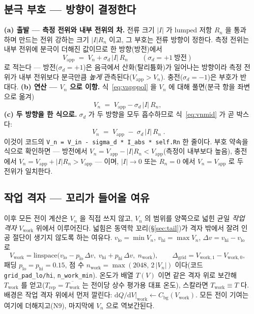 \documentclass[11pt,a4paper]{article}
\newcommand{\dd}{\mathrm{d}}
\newcommand{\app}{\mathrm{app}}
\newcommand{\bg}{\mathrm{bg}}
\newcommand{\work}{\mathrm{work}}
\newcommand{\code}[1]{\texttt{#1}}
\begin{document}
\subsection{분극 부호 — 방향이 결정한다}
\textbf{(a) 출발 — 측정 전위와 내부 전위의 차.} 전류 크기 $|I|$ 가 lumped 저항 $R_n$ 을 통과하며 만드는 전위 강하는
크기 $|I|R_n$ 이고, 그 부호는 전류 방향이 정한다. 측정 전위는 내부 전위에 분극이 더해진 값이므로 한 방향(방전)에서
\begin{equation}
V_\app\;=\;V_n+\sigma_d\,|I|\,R_n
\qquad(\sigma_d=+1\ \text{방전})
\label{eq:vapppol}
\end{equation}
로 적는다 — 방전($\sigma_d=+1$)은 음극에서 산화(탈리튬화)가 일어나는 방향이라 측정 전위가 내부 전위보다 분극만큼
\emph{높게} 관측된다($V_\app>V_n$). 충전($\sigma_d=-1$)은 부호가 반대다. \textbf{(b) 연산 — $V_n$ 으로 이항.}
식~\eqref{eq:vapppol} 을 $V_n$ 에 대해 풀면(분극 항을 좌변으로 옮겨)
\begin{equation}
V_n\;=\;V_\app-\sigma_d\,|I|\,R_n,
\label{eq:vnmid}
\end{equation}
\textbf{(c) 두 방향을 한 식으로.} $\sigma_d$ 가 두 방향을 모두 흡수하므로 식~\eqref{eq:vnmid} 가 곧 박스다:
\begin{equation}
\boxed{\;V_n\;=\;V_\app\;-\;\sigma_d\,|I|\,R_n\;.}
\label{eq:vn}
\end{equation}
이것이 코드의 \code{V\_n = V\_in - sigma\_d * I\_abs * self.Rn} 한 줄이다. 부호 약속을 식으로 확인하면 —
방전에서 $V_n=V_\app-|I|R_n<V_\app$(측정이 내부보다 높음), 충전에서 $V_n=V_\app+|I|R_n>V_\app$ — 이며,
$|I|\to0$ 또는 $R_n=0$ 에서 $V_n=V_\app$ 로 두 전위가 일치한다.

\subsection{작업 격자 — 꼬리가 들어올 여유}
이후 모든 전이 계산은 $V_n$ 을 직접 쓰지 않고, $V_n$ 의 범위를 양쪽으로 넓힌 균일 \emph{작업 격자} $V_\work$ 위에서
이루어진다. 넓힘은 동역학 꼬리(\S\ref{sec:tail})가 격자 밖에서 잘려 인공 절단이 생기지 않도록 하는 여유다.
$v_\mathrm{lo}=\min V_n$, $v_\mathrm{hi}=\max V_n$, $\Delta v=v_\mathrm{hi}-v_\mathrm{lo}$ 로
\begin{equation}
V_\work=\mathrm{linspace}\big(v_\mathrm{lo}-p_\mathrm{lo}\,\Delta v,\;
v_\mathrm{hi}+p_\mathrm{hi}\,\Delta v,\;n_\work\big),
\qquad \Delta_\mathrm{grid}=V_{\work,1}-V_{\work,0},
\label{eq:vwork}
\end{equation}
패딩 $p_\mathrm{lo}=p_\mathrm{hi}=0.15$, 점 수 $n_\work=\max(2048,\,2\,|V_n|)$ 이다(코드 \code{grid\_pad\_lo/hi},
\code{n\_work\_min}). 온도가 배열 $T(V)$ 이면 같은 격자 위로 보간해 $T_\work$ 를 얻고($T_\mathrm{rep}=\overline{T_\work}$ 는
전이당 상수 평가용 대표 온도), 스칼라면 $T_\work\equiv T$ 다. 배경은 작업 격자 위에서 먼저 깔린다:
$\dd Q/\dd V|_\work \leftarrow C_\bg(V_\work)$. 모든 전이 기여는 여기에 더해지고($\mathrm N9$), 마지막에 $V_n$ 으로
역보간된다.
\end{document}
